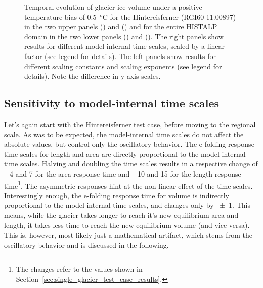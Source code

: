 \begin{figure}[ht]
      \caption{Temporal evolution of glacier ice volume under a positive temperature bias of \SI{+0.5}{\celsius} for the Hintereisferner (RGI60-11.00897) in the two upper panels () and () and for the entire HISTALP domain in the two lower panels () and (). The right panels show results for different model-internal time scales, scaled by a linear factor (see legend for details). The left panels show results for different scaling constants and scaling exponents (see legend for details). Note the difference in y-axis scales.}
      \label{fig:sensitivity}
    \end{figure}

    \subsection{Sensitivity to model-internal time scales} %
    \label{sec:sensitivity_to_model_internal_time_scales_results}
      Let's again start with the Hintereisferner test case, before moving to the regional scale. As was to be expected, the model-internal time scales do not affect the absolute values, but control only the oscillatory behavior. The e-folding response time scales for length and area are directly proportional to the model-internal time scales. Halving and doubling the time scales results in a respective change of \SI{-4}{\year} and \SI{+7}{\year} for the area response time and \SI{-10}{\year} and \SI{+15}{\year} for the length response time\footnote{The changes refer to the values shown in Section~\ref{sec:single_glacier_test_case_results}.}. The asymmetric responses hint at the non-linear effect of the time scales. Interestingly enough, the e-folding response time for volume is indirectly proportional to the model internal time scales, and changes only by \SI{\pm1}{\year}. This means, while the glacier takes longer to reach it's new equilibrium area and length, it takes less time to reach the new equilibrium volume (and vice versa). This is, however, most likely just a mathematical artifact, which stems from the oscillatory behavior and is discussed in the following.

